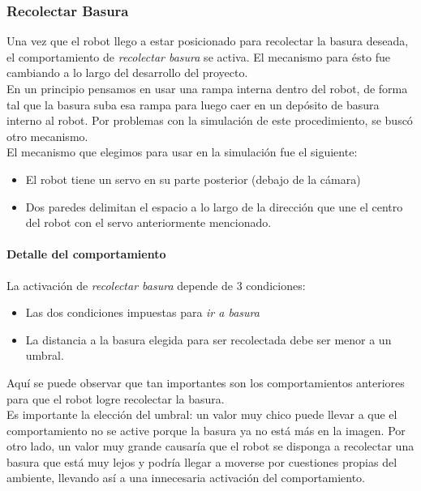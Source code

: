 \subsubsection{Recolectar Basura}
\label{collect_garbage}
Una vez que el robot llego a estar posicionado para recolectar la basura deseada,
el comportamiento de \emph{recolectar basura} se activa. El mecanismo para \'esto
fue cambiando a lo largo del desarrollo del proyecto.
\\
En un principio pensamos en usar una rampa interna dentro del robot, de forma
tal que la basura suba esa rampa para luego caer en un dep\'osito de basura
interno al robot. Por problemas con la simulaci\'on de este procedimiento, se
busc\'o otro mecanismo.
\\
El mecanismo que elegimos para usar en la simulaci\'on fue el siguiente:
\begin{itemize}
	\item El robot tiene un servo en su parte posterior (debajo de la c\'amara)
	\item Dos paredes delimitan el espacio a lo largo de la direcci\'on que une
			el centro del robot con el servo anteriormente mencionado.
\end{itemize}


\paragraph{Detalle del comportamiento}
La activaci\'on de \emph{recolectar basura} depende de 3 condiciones:
\begin{itemize}
	\item Las dos condiciones impuestas para \emph{ir a basura}
	\item La distancia a la basura elegida para ser recolectada debe ser menor a
			un umbral.
\end{itemize}

Aqu\'i se puede observar que tan importantes son los comportamientos anteriores
para que el robot logre recolectar la basura.
\\
Es importante la elecci\'on del umbral: un valor muy chico puede llevar a que el
comportamiento no se active porque la basura ya no est\'a m\'as en la imagen. Por
otro lado, un valor muy grande causar\'ia que el robot se disponga a recolectar 
una basura que est\'a muy lejos y podr\'ia llegar a moverse por cuestiones propias
del ambiente, llevando as\'i a una innecesaria activaci\'on del comportamiento.

